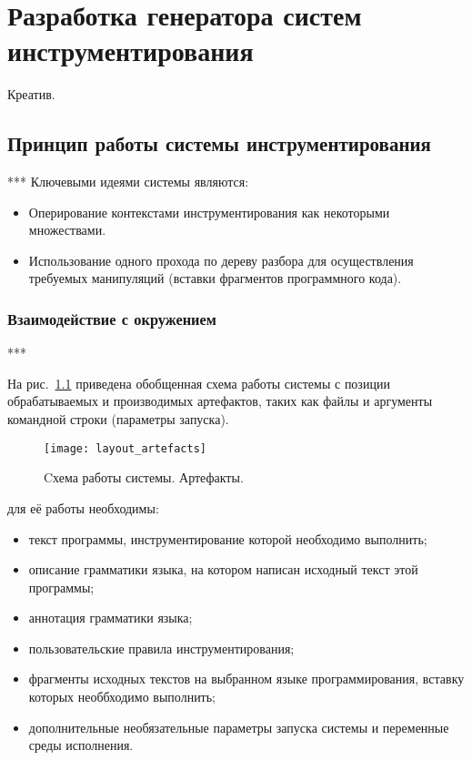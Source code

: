\chapter{Разработка генератора систем инструментирования}

Креатив.

\section{Принцип работы системы инструментирования}

***
Ключевыми идеями системы являются:
\begin{itemize}[noitemsep]
  \item Оперирование контекстами инструментирования как некоторыми множествами.
  \item Использование одного прохода по дереву разбора для осуществления требуемых манипуляций (вставки фрагментов программного кода).
\end{itemize}

\subsection{Взаимодействие с окружением}

***

На рис.~\ref{fig:layout_artefacts} приведена обобщенная схема работы системы с позиции обрабатываемых и производимых артефактов, таких как файлы и аргументы командной строки (параметры запуска).

\begin{figure}[!h]
	\centering
	\texttt{[image: layout\_artefacts]}
	\caption{Cхема работы системы. Артефакты.}
	\label{fig:layout_artefacts}
\end{figure}

для её работы необходимы:
\begin{itemize}[noitemsep]
  \item текст программы, инструментирование которой необходимо выполнить;
  \item описание грамматики языка, на котором написан исходный текст этой программы;
  \item аннотация грамматики языка;
  \item пользовательские правила инструментирования;
  \item фрагменты исходных текстов на выбранном языке программирования, вставку которых необбходимо выполнить;
  \item дополнительные необязательные параметры запуска системы и переменные среды исполнения.
\end{itemize}

